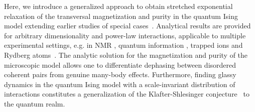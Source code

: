 \documentclass[aps,twocolumn,
superscriptaddress,
footinbib,
prl]{revtex4-1}
\begin{document}
Here, we introduce a generalized approach to obtain stretched exponential relaxation of the transversal magnetization and purity in the quantum Ising model extending earlier studies of special cases~\cite{doi:10.1063/1.470956,PhysRevA.94.053607}. Analytical results are provided for arbitrary dimensionality and power-law interactions, applicable to multiple experimental settings, e.g. in  NMR \cite{PhysRevLett.67.2076} , quantum information \cite{Harris162,PhysRevLett.86.5188}, trapped ions  \cite{Britton2012EngineeredSpins} and Rydberg atoms~\cite{Labuhn2016,Signoles2021GlassySystem}.
The analytic solution for the magnetization and purity of the microscopic model allows one to differentiate dephasing between disordered coherent pairs from genuine many-body effects. Furthermore, finding glassy dynamics in the quantum Ising model with a scale-invariant distribution of interactions constitutes a generalization of the Klafter-Shlesinger conjecture~\cite{Klafter1986OnSystems} to the quantum realm. 

\end{document}
